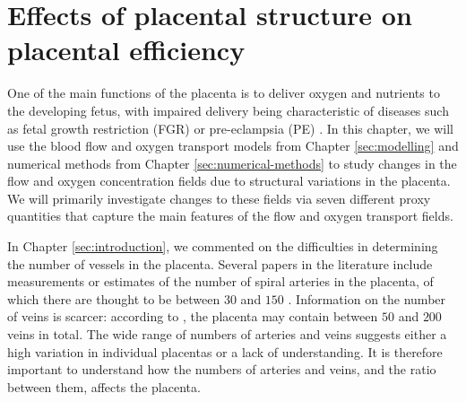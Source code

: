 \chapter{Effects of placental structure on placental efficiency} \label{sec:nutrient-uptake}
    
    One of the main functions of the placenta is to deliver oxygen and nutrients to the developing fetus, with impaired delivery being characteristic of diseases such as fetal growth restriction (FGR) or pre-eclampsia (PE) \cite{jensenBloodFlowTransport2019,burtonRheologicalPhysiologicalConsequences2009,burtonPathophysiologyPlacentalderivedFetal2018,dellschaftHaemodynamicsHumanPlacenta2020,serovOptimalVilliDensity2015}. In this chapter, we will use the blood flow and oxygen transport models from Chapter \ref{sec:modelling} and numerical methods from Chapter \ref{sec:numerical-methods} to study changes in the flow and oxygen concentration fields due to structural variations in the placenta. We will primarily investigate changes to these fields via seven different proxy quantities that capture the main features of the flow and oxygen transport fields.
    
    In Chapter \ref{sec:introduction}, we commented on the difficulties in determining the number of vessels in the placenta. Several papers in the literature include measurements or estimates of the number of spiral arteries in the placenta, of which there are thought to be between $30$ and $150$ \cite{benirschkePathologyHumanPlacenta2012,chernyavskyMathematicalModelIntervillous2010,kaufmannPlacentalVascularizationBlood1988}. Information on the number of veins is scarcer: according to \citeauthor{chernyavskyMathematicalModelIntervillous2010} \cite{chernyavskyMathematicalModelIntervillous2010}, the placenta may contain between $50$ and $200$ veins in total. The wide range of numbers of arteries and veins suggests either a high variation in individual placentas or a lack of understanding. It is therefore important to understand how the numbers of arteries and veins, and the ratio between them, affects the placenta.
    
